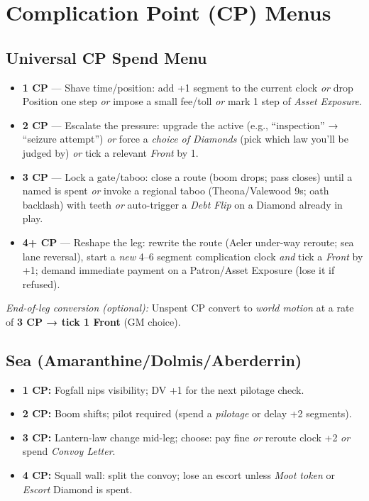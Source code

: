 \section{Complication Point (CP) Menus}

\subsection{Universal CP Spend Menu}
\begin{itemize}
  \item \textbf{1 CP} — Shave time/position: add +1 segment to the current clock \emph{or} drop Position one step \emph{or} impose a small fee/toll \emph{or} mark 1 step of \emph{Asset Exposure}.
  \item \textbf{2 CP} — Escalate the pressure: upgrade the active \SuitClub{} (e.g., ``inspection'' → ``seizure attempt'') \emph{or} force a \emph{choice of Diamonds} (pick which law you'll be judged by) \emph{or} tick a relevant \emph{Front} by 1.
  \item \textbf{3 CP} — Lock a gate/taboo: close a route (boom drops; pass closes) until a named \SuitDiamond{} is spent \emph{or} invoke a regional taboo (Theona/Valewood 9s; oath backlash) with teeth \emph{or} auto-trigger a \emph{Debt Flip} on a Diamond already in play.
  \item \textbf{4+ CP} — Reshape the leg: rewrite the route (Aeler under-way reroute; sea lane reversal), start a \emph{new} 4--6 segment complication clock \emph{and} tick a \emph{Front} by +1; demand immediate payment on a Patron/Asset Exposure (lose it if refused).
\end{itemize}
\textit{End-of-leg conversion (optional):} Unspent CP convert to \emph{world motion} at a rate of \textbf{3 CP → tick 1 Front} (GM choice).

\subsection{Sea (Amaranthine/Dolmis/Aberderrin)}
\begin{itemize}
  \item \textbf{1 CP:} Fogfall nips visibility; DV +1 for the next pilotage check.
  \item \textbf{2 CP:} Boom shifts; pilot required (spend a \emph{pilotage} \SuitDiamond{} or delay +2 segments).
  \item \textbf{3 CP:} Lantern-law change mid-leg; choose: pay fine \emph{or} reroute clock +2 \emph{or} spend \emph{Convoy Letter}.
  \item \textbf{4 CP:} Squall wall: split the convoy; lose an escort unless \emph{Moot token} or \emph{Escort} Diamond is spent.
\end{itemize}

